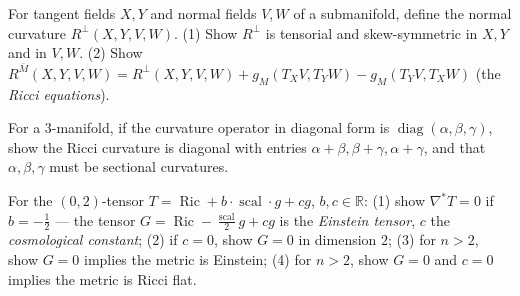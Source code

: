 \begin{remark}
  \label{rem:pet-ch3-ex-14}


  For tangent fields $X,Y$ and normal fields $V,W$ of a submanifold, define the
  normal curvature $R^\perp(X,Y,V,W)$. (1) Show $R^\perp$ is tensorial and
  skew-symmetric in $X,Y$ and in $V,W$. (2) Show
  $R^{\bar M}(X,Y,V,W)=R^\perp(X,Y,V,W)+g_M(T_XV,T_YW)-g_M(T_YV,T_XW)$ (the
  \emph{Ricci equations}).
\end{remark}

\begin{remark}
  \label{rem:pet-ch3-ex-15}


  For a $3$-manifold, if the curvature operator in diagonal form is
  $\operatorname{diag}(\alpha,\beta,\gamma)$, show the Ricci curvature is diagonal
  with entries $\alpha+\beta,\beta+\gamma,\alpha+\gamma$, and that
  $\alpha,\beta,\gamma$ must be sectional curvatures.
\end{remark}

\begin{remark}
  \label{rem:pet-ch3-ex-16}


  For the $(0,2)$-tensor $T=\operatorname{Ric}+b\cdot\operatorname{scal}\cdot
  g+cg$, $b,c\in\mathbb R$: (1) show $\nabla^*T=0$ if $b=-\tfrac12$ — the tensor
  $G=\operatorname{Ric}-\tfrac{\operatorname{scal}}2g+cg$ is the \emph{Einstein
  tensor}, $c$ the \emph{cosmological constant}; (2) if $c=0$, show $G=0$ in
  dimension $2$; (3) for $n>2$, show $G=0$ implies the metric is Einstein; (4)
  for $n>2$, show $G=0$ and $c=0$ implies the metric is Ricci flat.
\end{remark}


